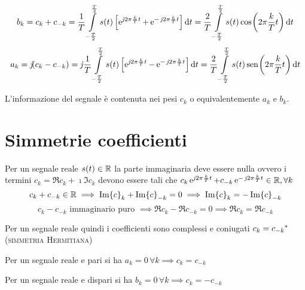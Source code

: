 \[b_k=c_k+c_{-k}=\frac{1}{T}\intd{-\frac{T}{2}}{\frac{T}{2}}{s(t)\left[\e{\imath 2\pi\frac{k}{T}t}+\e{-\imath 2\pi\frac{k}{T}t}\right]}{t}=\frac{2}{T}\intd{-\frac{T}{2}}{\frac{T}{2}}{s(t)\cos{2\pi\frac{k}{T}t}}{t} \]
\[a_k=\imath(c_k-c_{-k})=\imath\frac{1}{T}\intd{-\frac{T}{2}}{\frac{T}{2}}{s(t)\left[\e{\imath 2\pi\frac{k}{T}t}-\e{-\imath 2\pi\frac{k}{T}t}\right]}{t}=\frac{2}{T}\intd{-\frac{T}{2}}{\frac{T}{2}}{s(t)\sen{2\pi\frac{k}{T}t}}{t} \]

\begin{nota}L'informazione del segnale è contenuta nei pesi $c_k$ o equivalentemente $a_k$ e $b_k$.
\end{nota}

\section{Simmetrie coefficienti}
Per un segnale reale $s(t)\in\R$ la parte immaginaria deve essere nulla ovvero i termini $c_k=\Re c_k + \imath \Im c_k$ devono essere tali che $c_k \e{\imath 2\pi\frac{k}{T}t}+ c_{-k}\e{-\imath 2\pi\frac{k}{T}t}\in\R,\forall k$
\[c_k+c_{-k}\in\R \implies \Im c_k+\Im c_{-k}=0 \implies \Im c_k=-\Im c_{-k}\]
\[c_k-c_{-k} \text{ immaginario puro } \implies \Re c_k -\Re c_{-k}=0 \implies \Re c_k=\Re c_{-k} \]

Per un segnale reale quindi i coefficienti sono complessi e coniugati $c_k=\conj{c_{-k}}$ (\textsc{simmetria Hermitiana})

Per un segnale reale e pari si ha $a_k=0\,\forall k \implies c_k=c_{-k}$

Per un segnale reale e dispari si ha $b_k=0\,\forall k \implies c_k=-c_{-k}$

